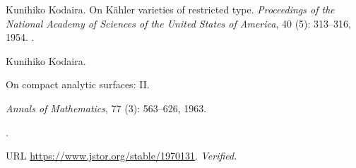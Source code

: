 Kunihiko Kodaira.
\newblock On K\"ahler varieties of restricted type.
\newblock \emph{Proceedings of the National Academy of Sciences of the
United States of America}, 40 (5): 313--316, 1954.
\newblock {}.


Kunihiko Kodaira.

\newblock On compact analytic surfaces: {II}.

\newblock \emph{Annals of Mathematics}, 77 (3): 563--626,
  1963.

\newblock {}.

\newblock URL \url{https://www.jstor.org/stable/1970131}.
\newblock \emph{Verified}.

